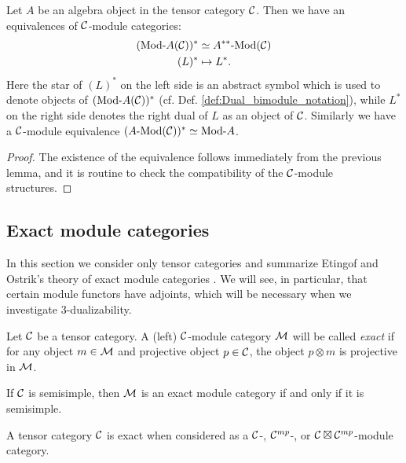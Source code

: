 \documentclass{amsart}
\begin{document}
\begin{lemma}
	Let $A$ be an algebra object in the tensor category $\mathcal C$. Then we have an equivalences of $\mathcal C$-module categories: 
	\begin{align*}
		(\Mod{}{A}(\cC))^* & \simeq \Mod{A^{**}}{}(\cC) \\
		(L)^* & \mapsto L^*.
	\end{align*}
	Here the star of $(L)^*$ on the left side is an abstract symbol which is used to denote objects of $(\Mod{}{A}(\cC))^*$ (cf. Def. \ref{def:Dual_bimodule_notation}), while $L^*$ on the right side denotes the right dual of $L$ as an object of $\mathcal C$. Similarly we have a $\mathcal C$-module equivalence $(\Mod{A}{}(\cC))^* \simeq \Mod{}{A}$.	
\end{lemma}

\begin{proof}
	The existence of the equivalence follows immediately from the previous lemma, and it is routine to check the compatibility of the $\mathcal C$-module structures.  
\end{proof}

\subsection{Exact module categories} \label{sec:tc-exact}
In this section we consider only tensor categories and summarize Etingof and Ostrik's theory of exact module categories \cite{MR2119143}.  We will see, in particular, that certain module functors have adjoints, which will be necessary when we investigate $3$-dualizability.

\begin{definition}
	Let $\mathcal C$ be a tensor category. A (left) $\mathcal C$-module category $\mathcal M$ will be called {\em exact} if for any object $m \in \mathcal M$ and  projective object $p \in \mathcal C$, the object $p \otimes m$ is projective in $\mathcal M$. 
\end{definition}

\begin{example}
	If $\mathcal C$ is semisimple, then $\mathcal M$ is an exact module category if and only if it is semisimple.
\end{example}

\begin{example} \label{ex:exactness}
	A tensor category $\mathcal C$ is exact when considered as a $\mathcal C$-, $\mathcal C^{mp}$-, or $\mathcal C \boxtimes \mathcal C^{mp}$-module category. 
\end{example}
\end{document}
